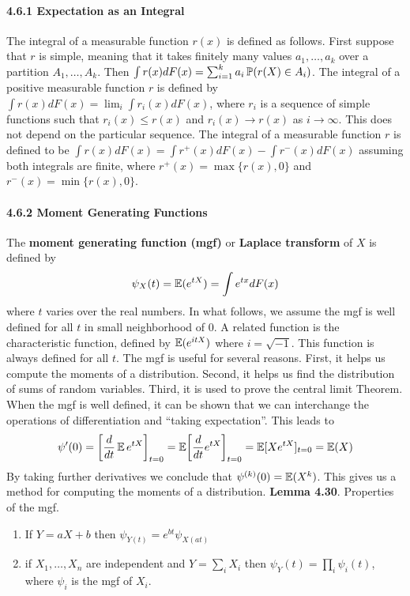 \paragraph{4.6.1 Expectation as an
Integral}\label{expectation-as-an-integral}
The integral of a measurable function \(r(x)\) is defined as follows.
First suppose that \(r\) is simple, meaning that it takes finitely many
values \(a_{1}, \dots, a_{k}\) over a partition \(A_{1}, \dots, A_{k}\). Then
\(\int r(x) dF(x) = \sum_{i=1}^{k} a_{i} \operatorname{\mathbb{P}}(r(X) \in A_{i})\). The
integral of a positive measurable function \(r\) is defined by
\(\int r(x) dF(x) = \lim_{i} \int r_{i}(x) dF(x)\), where \(r_{i}\) is a
sequence of simple functions such that \(r_{i}(x) \leq r(x)\) and
\(r_{i}(x) \rightarrow r(x)\) as \(i \rightarrow \infty\). This does not
depend on the particular sequence. The integral of a measurable function
\(r\) is defined to be
\(\int r(x) dF(x) = \int r^+(x) dF(x) - \int r^-(x) dF(x)\) assuming
both integrals are finite, where \(r^+(x) = \max \{ r(x), 0 \}\) and
\(r^-(x) = \min\{ r(x), 0 \}\).
\paragraph{4.6.2 Moment Generating
Functions}\label{moment-generating-functions}
The \textbf{moment generating function (mgf)} or \textbf{Laplace
transform} of \(X\) is defined by
\[
\psi_X(t) = \operatorname{\mathbb{E}}(e^{tX}) = \int e^{tx} dF(x)
\]
where \(t\) varies over the real numbers.
In what follows, we assume the mgf is well defined for all \(t\) in
small neighborhood of 0. A related function is the characteristic
function, defined by \(\operatorname{\mathbb{E}}(e^{itX})\) where \(i = \sqrt{-1}\).
This function is always defined for all \(t\). The mgf is useful for
several reasons. First, it helps us compute the moments of a
distribution. Second, it helps us find the distribution of sums of
random variables. Third, it is used to prove the central limit Theorem.
When the mgf is well defined, it can be shown that we can interchange
the operations of differentiation and ``taking expectation''. This leads
to
\[
\psi'(0) = \left[ \frac{d}{dt} \EXP e^{tX} \right]_{t = 0} = \EXP \left[ \frac{d}{dt} e^{tX} \right]_{t = 0}
= \EXP[X e^{tX}]_{t = 0} = \EXP(X)
\]
By taking further derivatives we conclude that
\(\psi^{(k)}(0) = \operatorname{\mathbb{E}}(X^{k})\). This gives us a method for
computing the moments of a distribution.
\textbf{Lemma 4.30}. Properties of the mgf.
\begin{enumerate}[tightlist,label={\arabic*.}]
\item
  If \(Y = aX + b\) then \(\psi_{Y(t)} = e^{bt} \psi_{X(at)}\)
\item
  if \(X_{1}, \dots, X_{n}\) are independent and \(Y = \sum_{i} X_{i}\) then
  \(\psi_Y(t) = \prod_{i} \psi_{i}(t)\), where \(\psi_{i}\) is the mgf of
  \(X_{i}\).
\end{enumerate}

